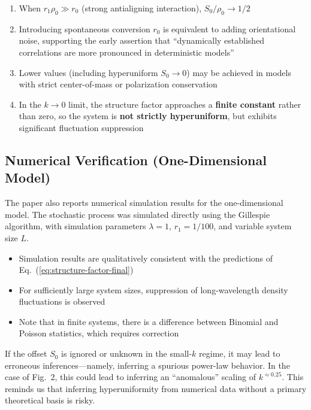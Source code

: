 \begin{notebox}
\begin{enumerate}
    \item When $r_1\rho_0 \gg r_0$ (strong antialigning interaction), $S_0/\rho_0 \to 1/2$
    \item Introducing spontaneous conversion $r_0$ is equivalent to adding orientational noise, supporting the early assertion that ``dynamically established correlations are more pronounced in deterministic models''
    \item Lower values (including hyperuniform $S_0 \to 0$) may be achieved in models with strict center-of-mass or polarization conservation
    \item In the $k \to 0$ limit, the structure factor approaches a \textbf{finite constant} rather than zero, so the system is \textbf{not strictly hyperuniform}, but exhibits significant fluctuation suppression
\end{enumerate}
\end{notebox}

\subsection{Numerical Verification (One-Dimensional Model)}\label{subsec:1d-numerics}

The paper also reports numerical simulation results for the one-dimensional model. The stochastic process was simulated directly using the Gillespie algorithm\cite{boltz2025}, with simulation parameters $\lambda = 1$, $r_1 = 1/100$, and variable system size $L$.

\begin{itemize}
    \item Simulation results are qualitatively consistent with the predictions of Eq.~(\ref{eq:structure-factor-final})
    \item For sufficiently large system sizes, suppression of long-wavelength density fluctuations is observed
    \item Note that in finite systems, there is a difference between Binomial and Poisson statistics, which requires correction
\end{itemize}

\begin{remark}
If the offset $S_0$ is ignored or unknown in the small-$k$ regime, it may lead to erroneous inferences---namely, inferring a spurious power-law behavior. In the case of Fig.~2, this could lead to inferring an ``anomalous'' scaling of $k^{\approx 0.25}$. This reminds us that inferring hyperuniformity from numerical data without a primary theoretical basis is risky.
\end{remark}
